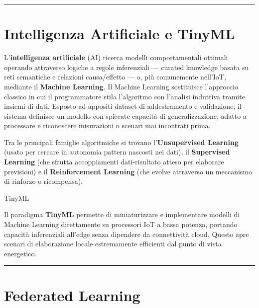 \documentclass[
  italian,
  openany]{book}
\begin{document}
\begin{center}\rule{0.5\linewidth}{0.5pt}\end{center}

\section{Intelligenza Artificiale e
TinyML}\label{intelligenza-artificiale-e-tinyml}

L'\textbf{intelligenza artificiale} (AI) ricerca modelli comportamentali
ottimali operando attraverso logiche a regole inferenziali --- curated
knowledge basata su reti semantiche e relazioni causa/effetto --- o, più
comunemente nell'IoT, mediante il \textbf{Machine Learning}. Il Machine
Learning sostituisce l'approccio classico in cui il programmatore stila
l'algoritmo con l'analisi induttiva tramite insiemi di dati. Esposto ad
appositi dataset di addestramento e validazione, il sistema definisce un
modello con spiccate capacità di generalizzazione, adatto a processare e
riconoscere misurazioni o scenari mai incontrati prima.

Tra le principali famiglie algoritmiche si trovano
l'\textbf{Unsupervised Learning} (usato per cercare in autonomia pattern
nascosti nei dati), il \textbf{Supervised Learning} (che sfrutta
accoppiamenti dati-risultato atteso per elaborare previsioni) e il
\textbf{Reinforcement Learning} (che evolve attraverso un meccanismo di
rinforzo o ricompensa).

\begin{calloutnote}{TinyML}

Il paradigma \textbf{TinyML} permette di miniaturizzare e implementare
modelli di Machine Learning direttamente su processori IoT a bassa
potenza, portando capacità inferenziali all'edge senza dipendere da
connettività cloud. Questo apre scenari di elaborazione locale
estremamente efficienti dal punto di vista energetico.

\end{calloutnote}

\begin{center}\rule{0.5\linewidth}{0.5pt}\end{center}

\section{Federated Learning}\label{federated-learning}
\end{document}
